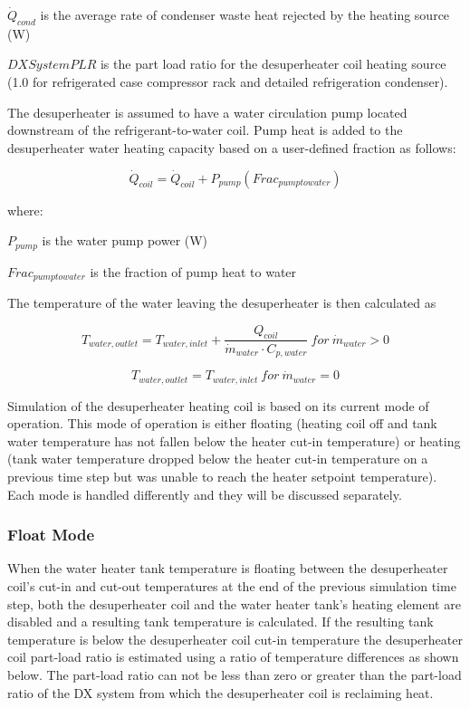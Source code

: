 \({\dot Q_{cond}}\) is the average rate of condenser waste heat rejected by the heating source (W)

\(DXSystemPLR\) is the part load ratio for the desuperheater coil heating source (1.0 for refrigerated case compressor rack and detailed refrigeration condenser).

The desuperheater is assumed to have a water circulation pump located downstream of the refrigerant-to-water coil. Pump heat is added to the desuperheater water heating capacity based on a user-defined fraction as follows:

\begin{equation}
{\dot Q_{coil}} = {\dot Q_{coil}} + {P_{pump}}\left( {Fra{c_{pumptowater}}} \right)
\end{equation}

where:

\({P_{pump}}\) is the water pump power (W)

\(Fra{c_{pumptowater}}\) is the fraction of pump heat to water

The temperature of the water leaving the desuperheater is then calculated as

\begin{equation}
{T_{water,outlet}} = {T_{water,inlet}} + \frac{{{Q_{coil}}}}{{{{\dot m}_{water}}\cdot {C_{p,water}}}} ~for~ {\dot m_{water}} > 0
\end{equation}

\begin{equation}
{T_{water,outlet}} = {T_{water,inlet}} ~for~ {\dot m_{water}} = 0
\end{equation}

Simulation of the desuperheater heating coil is based on its current mode of operation. This mode of operation is either floating (heating coil off and tank water temperature has not fallen below the heater cut-in temperature) or heating (tank water temperature dropped below the heater cut-in temperature on a previous time step but was unable to reach the heater setpoint temperature). Each mode is handled differently and they will be discussed separately.

\subsubsection{Float Mode}\label{float-mode}

When the water heater tank temperature is floating between the desuperheater coil's cut-in and cut-out temperatures at the end of the previous simulation time step, both the desuperheater coil and the water heater tank's heating element are disabled and a resulting tank temperature is calculated. If the resulting tank temperature is below the desuperheater coil cut-in temperature the desuperheater coil part-load ratio is estimated using a ratio of temperature differences as shown below. The part-load ratio can not be less than zero or greater than the part-load ratio of the DX system from which the desuperheater coil is reclaiming heat.

